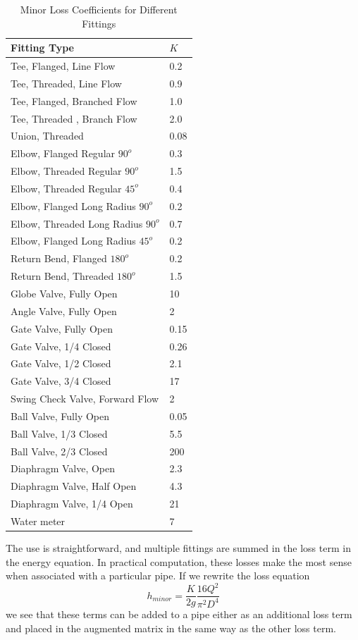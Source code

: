 \begin{table}[ht!]
   \centering
   \caption{Minor Loss Coefficients for Different Fittings}
   \footnotesize
\begin{tabular}{p{3in}p{.6in}}
Fitting Type & $K$ \\
\hline
\hline
Tee, Flanged, Line Flow&0.2\\
Tee, Threaded, Line Flow&0.9\\
Tee, Flanged, Branched Flow&1.0\\
Tee, Threaded , Branch Flow&2.0\\
Union, Threaded&0.08\\
Elbow, Flanged Regular $90^o$&0.3\\
Elbow, Threaded Regular $90^o$ &1.5\\
Elbow, Threaded Regular $45^o$ &0.4\\
Elbow, Flanged Long Radius $90^o$ &0.2\\
Elbow, Threaded Long Radius $90^o$ &0.7\\
Elbow, Flanged Long Radius $45^o$ &0.2\\
Return Bend, Flanged $180^o$ &0.2\\
Return Bend, Threaded $180^o$ &1.5\\
Globe Valve, Fully Open&10\\
Angle Valve, Fully Open&2\\
Gate Valve, Fully Open&0.15\\
Gate Valve, 1/4 Closed&0.26\\
Gate Valve, 1/2 Closed&2.1\\
Gate Valve, 3/4 Closed&17\\
Swing Check Valve, Forward Flow&2\\
Ball Valve, Fully Open&0.05\\
Ball Valve, 1/3 Closed&5.5\\
Ball Valve, 2/3 Closed&200\\
Diaphragm Valve, Open&2.3\\
Diaphragm Valve, Half Open&4.3\\
Diaphragm Valve, 1/4 Open&21\\
Water meter&7\\
\hline
\end{tabular}
\normalsize
\label{tab:minor-loss-coefficients}
\end{table}

The use is straightforward, and multiple fittings are summed in the loss term in the energy equation.
In practical computation, these losses make the most sense when associated with a particular pipe.  
If we rewrite the loss equation
\begin{equation}
h_{minor} = \frac{K}{2g} \frac{16Q^2}{\pi^2 D^4}
\label{eqn:minor-loss-model-discharge}
\end{equation}
we see that these terms can be added to a pipe either as an additional loss term and placed in the augmented matrix in the same way as the other loss term.

